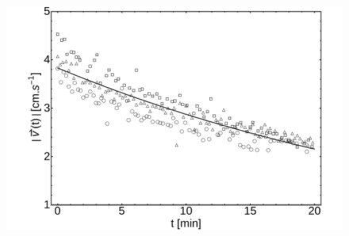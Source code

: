 \documentclass[journal=langd5, manuscript=article, layout=onecolumn]{achemso}
\begin{document}
\begin{figure}[ht]
    \begin{center}
       \includegraphics[scale=0.25]{lifetime.pdf}
    \end{center}
    \caption{}
    \label{fig:lifetime}
\end{figure}
\end{document}
